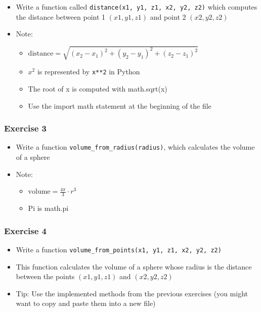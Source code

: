 \documentclass[10pt, a4paper]{beamer} %
\begin{document}
{\begin{frame}[c, fragile]
\begin{itemize}
    \item Write a function called \texttt{distance(x1, y1, z1, x2, y2, z2)} which computes the distance between point 1 $(x1, y1, z1)$ and point 2 $(x2, y2, z2)$
    \item Note:
        \begin{itemize}
            \item \( \text{distance} = \sqrt{\left(x_2 - x_1\right)^2 + \left(y_2 - y_1\right)^2 + \left(z_2 - z_1\right)^2} \)
            \item $x^2$ is represented by \texttt{x**2} in Python
            \item The root of x is computed with math.sqrt(x)
            \item Use the import math statement at the beginning of the file
        \end{itemize}
\end{itemize}
\end{frame}

\begin{frame}[c, fragile]\frametitle{Exercise 3}
\begin{itemize}
    \item Write a function \texttt{volume\_from\_radius(radius)}, which calculates the
volume of a sphere
    \item Note:
    \begin{itemize}
        \item \( \text{volume} = \frac{4\pi}{3}\cdot r^3\)
        \item Pi is math.pi
    \end{itemize}
\end{itemize}
    
\end{frame}


\begin{frame}[c, fragile]\frametitle{Exercise 4}
\begin{itemize}
    \item Write a function \texttt{volume\_from\_points(x1, y1, z1, x2, y2, z2)}
    \item This function calculates the volume of a sphere whose radius is the distance between the points $(x1, y1, z1)$ and $(x2, y2, z2)$
    \item Tip: Use the implemented methods from the previous exercises (you might want to copy and paste them into a new file)
\end{itemize}
    

\end{frame}}
\end{document}
